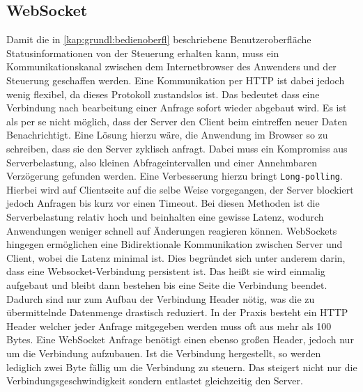 \subsection{WebSocket} \label{chp:grdlgn:webSocket}
Damit die in \ref{kap:grundl:bedienoberfl} beschriebene Benutzeroberfläche Statusinformationen von der Steuerung erhalten kann, muss ein Kommunikationskanal zwischen dem Internetbrowser des Anwenders und der Steuerung geschaffen werden. Eine Kommunikation per HTTP ist dabei jedoch wenig flexibel, da dieses Protokoll zustandslos ist. Das bedeutet dass eine Verbindung nach bearbeitung einer Anfrage sofort wieder abgebaut wird. Es ist als per se nicht möglich, dass der Server den Client beim eintreffen neuer Daten Benachrichtigt. Eine Lösung hierzu wäre, die Anwendung im Browser so zu schreiben, dass sie den Server zyklisch anfragt. Dabei muss ein Kompromiss aus Serverbelastung, also kleinen Abfrageintervallen und einer Annehmbaren Verzögerung gefunden werden. Eine Verbesserung hierzu bringt \texttt{Long-polling}. Hierbei wird auf Clientseite auf die selbe Weise vorgegangen, der Server blockiert jedoch Anfragen bis kurz vor einen Timeout. Bei diesen Methoden ist die Serverbelastung relativ hoch und beinhalten eine gewisse Latenz, wodurch Anwendungen weniger schnell auf Änderungen reagieren können. WebSockets hingegen ermöglichen eine Bidirektionale Kommunikation zwischen Server und Client, wobei die Latenz minimal ist. Dies begründet sich unter anderem darin, dass eine Websocket-Verbindung persistent ist. Das heißt sie wird einmalig aufgebaut und bleibt dann bestehen bis eine Seite die Verbindung beendet. Dadurch sind nur zum Aufbau der Verbindung Header nötig, was die zu übermittelnde Datenmenge drastisch reduziert. In der Praxis besteht ein HTTP Header welcher jeder Anfrage mitgegeben werden muss oft aus mehr als 100 Bytes. Eine WebSocket Anfrage benötigt einen ebenso großen Header, jedoch nur um die Verbindung aufzubauen. Ist die Verbindung hergestellt, so werden lediglich zwei Byte fällig um die Verbindung zu steuern. Das steigert nicht nur die Verbindungsgeschwindigkeit sondern entlastet gleichzeitig den Server.
\clearpage
